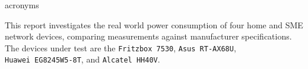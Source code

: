 \documentclass[a4paper,oneside,10pt,ngerman,english]{scrartcl}
\begin{document}




\maketitle


\cleardoubleoddpage
\setcounter{secnumdepth}{3}
\setcounter{tocdepth}{2}  %
\tableofcontents



{acronyms}



\cleardoubleoddpage

This report investigates the real world power consumption of four home and \ac{SME} network devices, comparing measurements against manufacturer specifications.
The devices under test are the \texttt{Fritzbox~7530}, \texttt{Asus~RT-AX68U}, \texttt{Huawei~EG8245W5-8T}, and \texttt{Alcatel~HH40V}.
\end{document}
